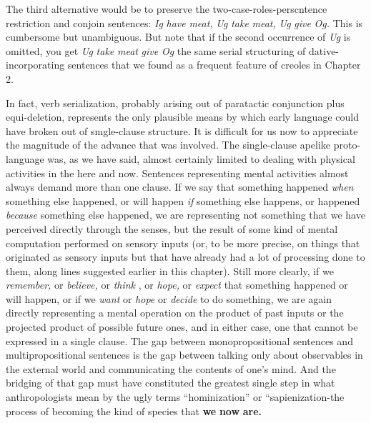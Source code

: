 The third alternative would be to preserve the two-case-roles-per\-scntence restriction and conjoin sentences: \textit{Ig} \textit{have} \textit{meat,} \textit{Ug} \textit{take} \textit{meat,} \textit{Ug} \textit{give} \textit{Og.} This is cumbersome but unambiguous. But note that if the second occurrence of \textit{Ug} is omitted, you get \textit{Ug} \textit{take} \textit{meat} \textit{give} \textit{Og\-} the same serial structuring of dative-incorporating sentences that we found as a frequent feature of creoles in Chapter 2.

In fact, verb serialization, probably arising out of paratactic con\-junction plus equi-deletion, represents the only plausible means by which early language could have broken out of smgle-clause structure. It is difficult for us now to appreciate the magnitude of the advance that was involved. The single-clause apelike proto-language was, as we have said, almost certainly limited to dealing with physical activities in the here and now. Sentences representing mental activities almost always demand more than one clause. If we say that something hap\-pened \textit{when} something else happened, or will happen \textit{if} something else happens, or happened \textit{because} something else happened, we are repre\-senting not something that we have perceived directly through the senses, but the result of some kind of mental computation performed
on sensory inputs (or, to be more precise, on things that originated as sensory inputs but that have already had a lot of processing done to them, along lines suggested earlier in this chapter). Still more clearly, if we \textit{remember,} or \textit{believe,} or \textit{think} , or \textit{hope,} or \textit{expect} that something happened or will happen, or if we \textit{want} or \textit{hope} or \textit{decide} to do some\-thing, we are again directly representing a mental operation on the product of past inputs or the projected product of possible future ones, and in either case, one that cannot be expressed in a single clause. The gap between monopropositional sentences and multipropositional sentences is the gap between talking only about observables in the external world and communicating the contents of one's mind. And the bridging of that gap must have constituted the greatest single step in what anthropologists mean by the ugly terms ``hominization'' or ``sapienization{\textquotedbl}{}-the process of becoming the kind of species that \textbf{we} \textbf{now} \textbf{are.}

